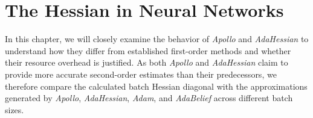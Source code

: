 \chapter{The Hessian in Neural Networks}\label{ch:mathtest} %
In this chapter, we will closely examine the behavior of \emph{Apollo} and \emph{AdaHessian} to understand how they differ from established first-order methods and whether their resource overhead is justified.
As both \emph{Apollo} and \emph{AdaHessian} claim to provide more accurate second-order estimates
than their predecessors, we therefore compare the calculated batch Hessian
diagonal with the approximations generated by \emph{Apollo}, \emph{AdaHessian}, \emph{Adam}, and \emph{AdaBelief}
across different batch sizes.

